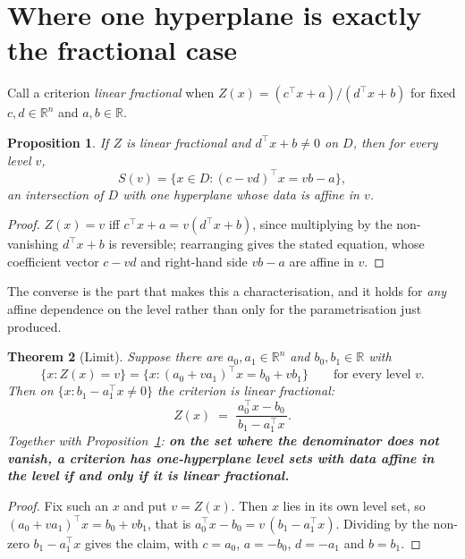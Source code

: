 \documentclass[11pt,a4paper]{article}
\newcommand{\Dset}{D}
\newcommand{\Z}{Z}
\newcommand{\R}{\mathbb{R}}
\theoremstyle{plain}
\newtheorem{theorem}{Theorem}
\newtheorem{proposition}[theorem]{Proposition}
\theoremstyle{definition}
\begin{document}
\section{Where one hyperplane is exactly the fractional case}

Call a criterion \emph{linear fractional} when
$\Z(x) = (c^{\top}x + a)/(d^{\top}x + b)$ for fixed $c,d \in \R^n$ and
$a,b \in \R$.

\begin{proposition}\label{prop:lf-gives-hyperplane}
If $\Z$ is linear fractional and $d^{\top}x + b \neq 0$ on $\Dset$, then for
every level $v$,
\[
  S(v) = \{x \in \Dset : (c - v d)^{\top} x = v b - a\} ,
\]
an intersection of $\Dset$ with one hyperplane whose data is affine in $v$.
\end{proposition}

\begin{proof}
$\Z(x) = v$ iff $c^{\top}x + a = v(d^{\top}x + b)$, since multiplying by the
non-vanishing $d^{\top}x+b$ is reversible; rearranging gives the stated
equation, whose coefficient vector $c - vd$ and right-hand side $vb-a$ are
affine in $v$.
\end{proof}

The converse is the part that makes this a characterisation, and it holds for
\emph{any} affine dependence on the level rather than only for the
parametrisation just produced.

\begin{theorem}[Limit]\label{th:limit}
Suppose there are $a_0, a_1 \in \R^n$ and $b_0, b_1 \in \R$ with
\[
  \{x : \Z(x) = v\} = \{x : (a_0 + v a_1)^{\top} x = b_0 + v b_1\}
  \qquad \text{for every level } v .
\]
Then on $\{x : b_1 - a_1^{\top}x \neq 0\}$ the criterion is linear fractional:
\[
  \Z(x) \;=\; \frac{a_0^{\top}x - b_0}{\,b_1 - a_1^{\top}x\,} .
\]
Together with Proposition~\ref{prop:lf-gives-hyperplane}: \textbf{on the set
where the denominator does not vanish, a criterion has one-hyperplane level
sets with data affine in the level if and only if it is linear fractional.}
\end{theorem}

\begin{proof}
Fix such an $x$ and put $v = \Z(x)$.  Then $x$ lies in its own level set, so
$(a_0 + v a_1)^{\top}x = b_0 + v b_1$, that is
$a_0^{\top}x - b_0 = v\,(b_1 - a_1^{\top}x)$.  Dividing by the non-zero
$b_1 - a_1^{\top}x$ gives the claim, with $c = a_0$, $a = -b_0$, $d = -a_1$
and $b = b_1$.
\end{proof}
\end{document}
